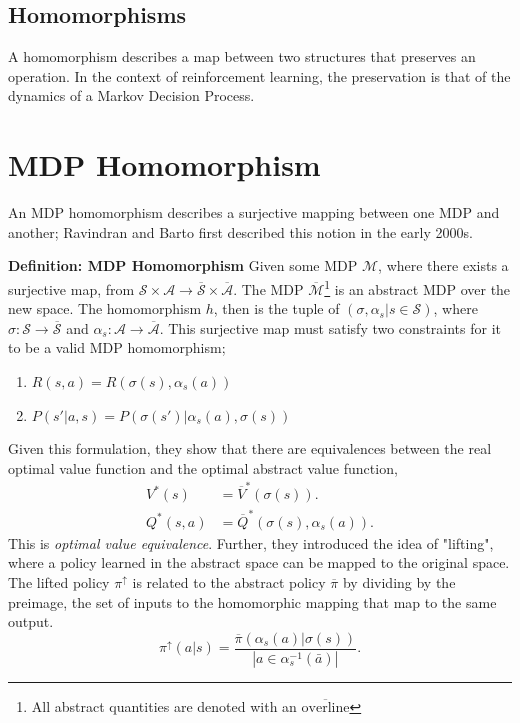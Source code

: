 \subsection{Homomorphisms}
A homomorphism describes a map between two structures that preserves an operation. In the context of reinforcement learning, the preservation is that of the dynamics of a Markov Decision Process.

\section{MDP Homomorphism}
An MDP homomorphism describes a surjective mapping between one MDP and another; Ravindran and Barto first described this notion in the early 2000s\cite{ravindran2003smdp,ravindran2001symmetries}.

\textbf{Definition: MDP Homomorphism} Given some MDP $\mathcal{M}$, where there exists a surjective map, from $\mathcal{S} \times \mathcal{A} \rightarrow \overline{\mathcal{S}} \times \overline{\mathcal{A}}$. The MDP $\overline{\mathcal{M}}$\footnote{All abstract quantities are denoted with an $\overline{\text{overline}}$} is an abstract MDP over the new space. The homomorphism $h$, then is the tuple of $(\sigma, \alpha_s|s \in \mathcal{S})$, where $\sigma: \mathcal{S} \rightarrow \overline{\mathcal{S}}$ and $\alpha_s : \mathcal{A} \rightarrow \overline{\mathcal{A}}$. This surjective map must satisfy two constraints for it to be a valid MDP homomorphism;
\begin{enumerate}
	\item $R(s, a) = R(\sigma(s), \alpha_s(a))$
	\item $P(s'| a, s) = P(\sigma(s')| \alpha_s(a), \sigma(s))$
\end{enumerate}

Given this formulation, they show that there are equivalences between the real optimal value function and the optimal abstract value function,
\begin{align*}
	V^*(s)    & = \overline{V}^*(\sigma(s)).              \\
	Q^*(s, a) & = \overline{Q}^*(\sigma(s), \alpha_s(a)).
\end{align*}
This is \textit{optimal value equivalence}. Further, they introduced the idea of "lifting", where a policy learned in the abstract space can be mapped to the original space. The lifted policy $\pi^\uparrow$ is related to the abstract policy $\overline{\pi}$ by dividing by the preimage, the set of inputs to the homomorphic mapping that map to the same output.
\begin{equation}
	\pi^\uparrow(a | s) = \frac{\overline{\pi}(\alpha_s(a) | \sigma(s))}{| a \in \alpha^{-1}_s(\bar{a})|}.
\end{equation}

